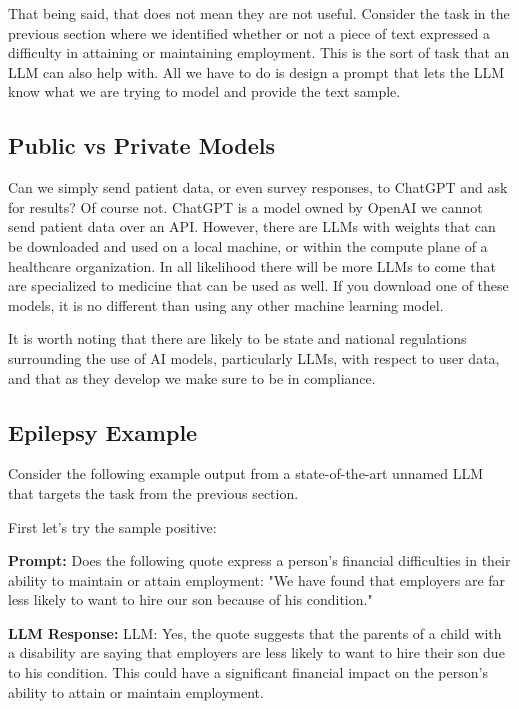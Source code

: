 That being said, that does not mean they are not useful. Consider the task in the previous section where we identified whether or not a piece of text
expressed a difficulty in attaining or maintaining employment. This is the sort of task that an LLM can also help with. All we have to do
is design a prompt that lets the LLM know what we are trying to model and provide the text sample.

\subsection{Public vs Private Models}

Can we simply send patient data, or even survey responses, to ChatGPT and ask for results? Of course not. ChatGPT is a model owned by OpenAI we cannot send
patient data over an API. However, there are LLMs with weights that can be downloaded and used on a local machine, or within the compute plane of a healthcare
organization. In all likelihood there will be more LLMs to come that are specialized to medicine that can be used as well. If you download one of these models,
it is no different than using any other machine learning model.

It is worth noting that there are likely to be state and national regulations surrounding the use of AI models, particularly LLMs, with respect to user data, and
that as they develop we make sure to be in compliance.

\subsection{Epilepsy Example}

Consider the following example output from a state-of-the-art unnamed LLM that targets the task from the previous section.

First let's try the sample positive:

\begin{displayquote}
  \textbf{Prompt:} Does the following quote express a person's financial difficulties in their ability to maintain or attain employment: "We have found that employers are far less likely to want to hire our son because of his condition."
\end{displayquote}

\begin{displayquote}
  \textbf{LLM Response:} LLM: Yes, the quote suggests that the parents of a child with a disability are saying that employers are less likely to want to hire their son due to his condition. This could have a significant financial impact on the person's ability to attain or maintain employment.
\end{displayquote}

